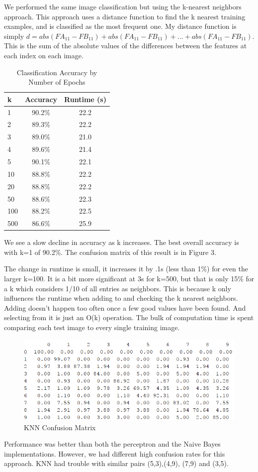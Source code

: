 \documentclass{article}[12pt]
\begin{document}
  We performed the same image classification but using the k-nearest neighbors approach. This approach uses a distance function to find the k nearest training examples, and is classified as the most frequent one. My distance function is simply $d=abs(FA_{11} - FB_{11}) + abs(FA_{11} - FB_{11}) + ... + abs(FA_{11} - FB_{11})$. This is the sum of the absolute values of the differences between the features at each  index on each image.
  
        \begin{table}[ht]
   	\centering
   	\begin{tabular}{l | c | c}
   		\hline
   		 k  & Accuracy & Runtime (s)\\
   		\hline \hline \hline
   		1 & 90.2\% & 22.2\\
   		2 & 89.3\% & 22.2\\
   		3 & 89.0\% & 21.0\\
   		4 & 89.6\% &21.4\\
   		5 & 90.1\% & 22.1\\
   		10 & 88.8\% & 22.2\\
   		20 & 88.8\% & 22.2\\
   		50 & 88.6\% & 22.3\\
   		100 & 88.2\% &22.5\\
   		500 & 86.6\% & 25.9\\
   		\hline
   	\end{tabular}
   	\caption{Classification Accuracy by Number of Epochs} \label{tab:digack}
   \end{table}
   
   We see a slow decline in accuracy as k increases. The best overall accuracy is with k=1 of 90.2\%. The confusion matrix of this result is in Figure 3.
   
   The change in runtime is small, it increases it by .1s (less than 1\%) for even the larger k=100. It is a bit more significant at 3s for k=500, but that is only 15\% for a k which considers 1/10 of all entries as neighbors.  This is because k only influences the runtime when adding to and checking the k nearest neighbors. Adding doesn't happen too often once a few good values have been found. And selecting from it is just an O(k) operation. The bulk of computation time is spent comparing each test image to every single training image.
   
       \begin{figure}[!htb]
   	\centering
   	\includegraphics[scale=0.9]{confusion_knn.png}
   	\caption{KNN Confusion Matrix}
   	\label{fig:cm31}
   \end{figure}
   
   Performance was better than both the perceptron and the Naive Bayes implementations. However, we had different high confusion rates for this approach. KNN had trouble with similar pairs (5,3),(4,9), (7,9) and (3,5).
\end{document}
